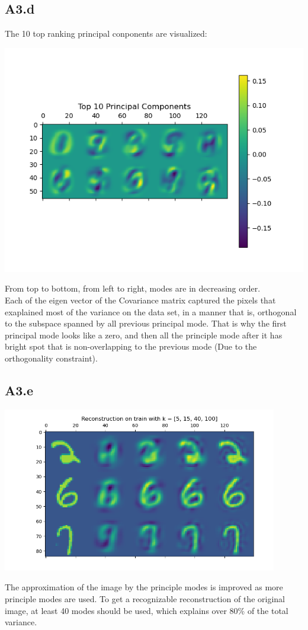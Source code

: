 \documentclass[]{article}
\begin{document}
    \subsection*{A3.d}
        The 10 top ranking principal conponents are visualized: 
        \begin{center}
            \includegraphics*[]{A3plots/22-18-12-top10-principal-modes.png}
        \end{center}
        From top to bottom, from left to right, modes are in decreasing order. 
        \\[1.1em]
        Each of the eigen vector of the Covariance matrix captured the pixels that exaplained most of the variance on the data set, in a manner that is, orthogonal to the subspace spanned by all previous principal mode. That is why the first principal mode looks like a zero, and then all the principle mode after it has bright spot that is non-overlapping to the previous mode (Due to the orthogonality constraint). 
    \subsection*{A3.e}
        \begin{center}
            \includegraphics*[width=12cm]{A3plots/22-18-13-pca-reconstruction.png}
        \end{center}
        The approximation of the image by the principle modes is improved as more principle modes are used. To get a recognizable reconstruction of the original image, at least 40 modes should be used, which explains over 80\% of the total variance. 
\end{document}
